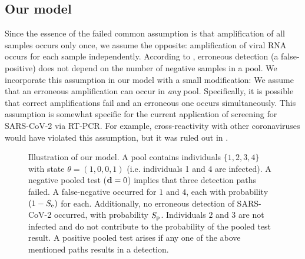 \documentclass{article}
\begin{document}
\subsection{Our model}
Since the essence of the failed common assumption is that
amplification of all samples occurs only once, we assume the opposite:
amplification of viral RNA occurs for each sample independently.
According to \cite{Simplistic1, Simplistic2, Kim, OptimalDorfmanPool},
erroneous detection (a false-positive) does not depend on the number
of negative samples in a pool. We incorporate this assumption in our
model with a small modification: We assume that an erroneous
amplification can occur in \emph{any} pool. Specifically, it is
possible that correct amplifications fail and an erroneous one occurs
simultaneously. This assumption is somewhat specific for the current
application of screening for SARS-CoV-2 via RT-PCR. For example,
cross-reactivity with other coronaviruses would have violated this
assumption, but it was ruled out in \cite{KitComparison}.

\begin{figure}[H]
  \centering
  \caption{Illustration of our model. A pool contains individuals
    $\{1,2,3,4\}$ with state $\theta=(1,0,0,1)$ (i.e. individuals 1
    and 4 are infected). A negative pooled test ($\mathbf{d}=0$) implies
    that three detection paths failed. A false-negative occurred for
    $1$ and $4$, each with probability $(1-S_{\text{e}})$ for
    each. Additionally, no erroneous detection of SARS-CoV-2 occurred,
    with probability $S_{\text{p}}$. Individuals $2$ and $3$ are not infected
    and do not contribute to the probability of the pooled test
    result. A positive pooled test arises if any one of the above
    mentioned paths results in a detection.}\label{fig:likelihood}
\end{figure}
\end{document}
